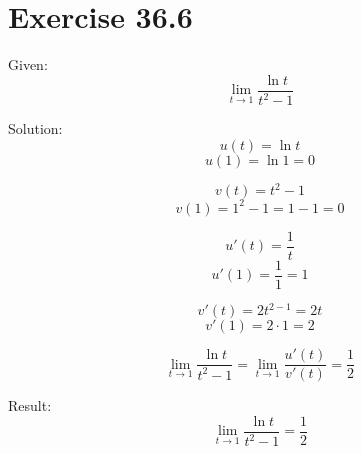 \documentclass[a4paper, 10pt]{scrartcl}
\begin{document}
\section{Exercise 36.6}

Given:
\[\lim_{t\to 1}{\frac{\ln{t}}{t^{2} - 1}}\]

Solution:
\[u(t) = \ln{t}\]
\[u(1) = \ln{1} = 0\]

\[v(t) = t^{2} - 1\]
\[v(1) = 1^{2} - 1 = 1 - 1 = 0\]

\[u'(t) = \frac{1}{t}\]
\[u'(1) = \frac{1}{1} = 1\]

\[v'(t) = 2t^{2 - 1} = 2t\]
\[v'(1) = 2\cdot 1 = 2\]

\[\lim_{t\to 1}{\frac{\ln{t}}{t^{2} - 1}} = \lim_{t\to 1}{\frac{u'(t)}{v'(t)}} = \frac{1}{2}\]

Result:
\[\lim_{t\to 1}{\frac{\ln{t}}{t^{2} - 1}} = \frac{1}{2}\]
\end{document}

